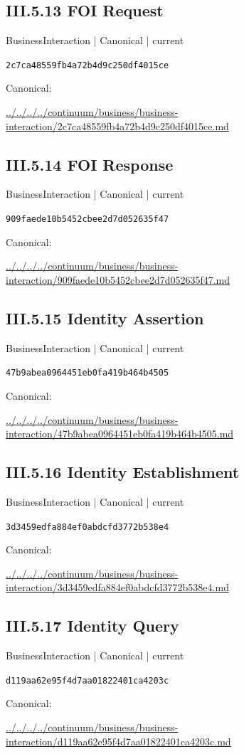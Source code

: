 \documentclass[10pt,a4paper]{article}
\begin{document}
\subsection*{III.5.13 FOI Request}
{\small BusinessInteraction | Canonical | current}\par
\texttt{2c7ca48559fb4a72b4d9c250df4015ce}\par
Canonical: \par
{\footnotesize\url{../../../../continuum/business/business-interaction/2c7ca48559fb4a72b4d9c250df4015ce.md}}\par
\subsection*{III.5.14 FOI Response}
{\small BusinessInteraction | Canonical | current}\par
\texttt{909faede10b5452cbee2d7d052635f47}\par
Canonical: \par
{\footnotesize\url{../../../../continuum/business/business-interaction/909faede10b5452cbee2d7d052635f47.md}}\par
\subsection*{III.5.15 Identity Assertion}
{\small BusinessInteraction | Canonical | current}\par
\texttt{47b9abea0964451eb0fa419b464b4505}\par
Canonical: \par
{\footnotesize\url{../../../../continuum/business/business-interaction/47b9abea0964451eb0fa419b464b4505.md}}\par
\subsection*{III.5.16 Identity Establishment}
{\small BusinessInteraction | Canonical | current}\par
\texttt{3d3459edfa884ef0abdcfd3772b538e4}\par
Canonical: \par
{\footnotesize\url{../../../../continuum/business/business-interaction/3d3459edfa884ef0abdcfd3772b538e4.md}}\par
\subsection*{III.5.17 Identity Query}
{\small BusinessInteraction | Canonical | current}\par
\texttt{d119aa62e95f4d7aa01822401ca4203c}\par
Canonical: \par
{\footnotesize\url{../../../../continuum/business/business-interaction/d119aa62e95f4d7aa01822401ca4203c.md}}\par
\end{document}
